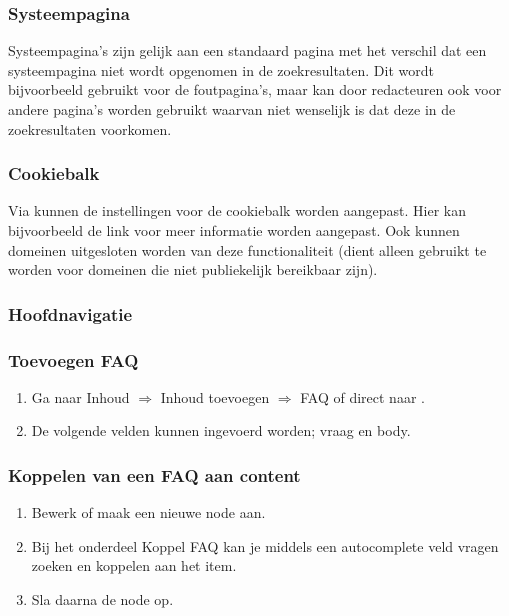 \subsubsection{Systeempagina}
Systeempagina's zijn gelijk aan een standaard pagina met het verschil dat een systeempagina niet wordt opgenomen in de zoekresultaten. Dit wordt bijvoorbeeld gebruikt voor de foutpagina's, maar kan door redacteuren ook voor andere pagina's worden gebruikt waarvan niet wenselijk is dat deze in de zoekresultaten voorkomen.

\subsubsection{Cookiebalk}
Via  kunnen de instellingen voor de cookiebalk worden aangepast. Hier kan bijvoorbeeld de link voor meer informatie worden aangepast. Ook kunnen domeinen uitgesloten worden van deze functionaliteit (dient alleen gebruikt te worden voor domeinen die niet publiekelijk bereikbaar zijn).

\subsubsection{Hoofdnavigatie}

\subsubsection{Toevoegen FAQ}

\begin{enumerate}
\item Ga naar Inhoud $\Rightarrow$ Inhoud toevoegen $\Rightarrow$ FAQ of direct naar .
\item De volgende velden kunnen ingevoerd worden; vraag en body.
\end{enumerate}

\subsubsection{Koppelen van een FAQ aan content}

\begin{enumerate}
\item Bewerk of maak een nieuwe node aan.
\item Bij het onderdeel Koppel FAQ kan je middels een autocomplete veld vragen zoeken en koppelen aan het item.
\item Sla daarna de node op.
\end{enumerate}
